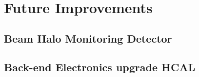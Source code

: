 \section{Future Improvements}


\subsection{Beam Halo Monitoring Detector}


\subsection{Back-end Electronics upgrade HCAL}

